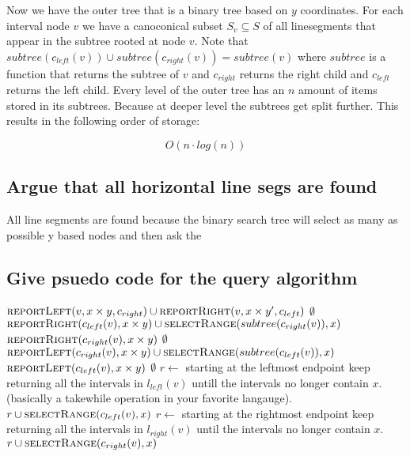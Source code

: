 \documentclass{article}
\begin{document}
Now we have the outer tree that is a binary tree based on $y$ coordinates.
For each interval node $v$ we have a canoconical subset $S_v \subseteq S$
of all linesegments that appear in the subtree rooted at node $v$.
Note that $subtree(c_{left}(v))\cup subtree(c_{right}(v)) = subtree(v)$
where $subtree$ is a function that returns the subtree of $v$ and 
$c_{right}$ returns the right child and $c_{left}$ returns the left child.
Every level of the outer tree has an $n$ amount of items stored in its
subtrees. Because at deeper level the subtrees get split further.
This results in the following order of storage:

\[ O(n \cdot log(n))\]


\subsection{Argue that all horizontal line segs are found}
All line segments are found because the binary search tree will
select as many as possible y based nodes and then ask the 

\newpage
\subsection{Give psuedo code for the query algorithm}
\begin{algorithmic}[1]
			\State
			\Return {}
		\EndIf
		\State
		\Return {}
		\EndIf
		\State
		\Return {}
		\EndIf
		\State
		\State
		\Return $\Call{reportLeft}{v, x\times y, c_{right}}\cup
		\Call{reportRight}{v,x\times y', c_{left}}$
	\EndFunction
			\State
			\Return $\emptyset$
		\EndIf
		\State
		\Return $\Call{reportRight}{c_{left}(v), x \times y} \cup
		\Call{selectRange}{subtree(c_{right}(v)),x}$
		\EndIf
		\State
		\Return $\Call{reportRight}{c_{right}(v), x \times y}$
	\EndFunction
			\State
			\Return $\emptyset$
		\EndIf
		\State
		\Return $\Call{reportLeft}{c_{right}(v), x \times y} \cup
		\Call{selectRange}{subtree(c_{left}(v)),x}$
		\EndIf
		\State
		\Return $\Call{reportLeft}{c_{left}(v), x \times y}$
	\EndFunction
		\State
		\Return $\emptyset$
	\EndIf
		\State
		$r \gets $ starting at the leftmost endpoint keep
		returning all the intervals in $l_{left}(v)$ untill the
		intervals no longer contain $x$. (basically a takewhile
		operation in your favorite langauge).
		\State
		\Return $r \cup \Call{selectRange}{c_{left}(v),x}$
	\EndIf
	\State
	$r \gets $ starting at the rightmost endpoint keep
	returning all the intervals in $l_{right}(v)$ until the
	intervals no longer contain $x$.
	\State
	\Return $r \cup \Call{selectRange}{c_{right}(v),x}$
	\EndFunction
\end{algorithmic}
\end{document}
